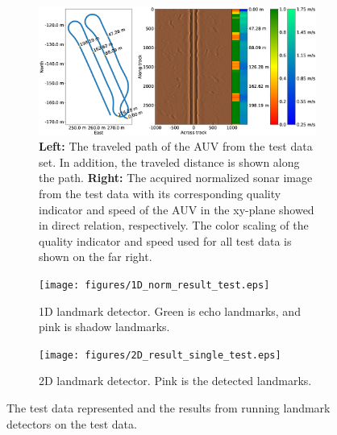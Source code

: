 \begin{figure} [hb] %
     \centering
    \begin{subfigure}[t]{0.87\textwidth}
         \centering
         \includegraphics[trim=0cm 3.4cm 0cm 3.4cm, clip=true, width=\textwidth]{figures/path_sonar_colorbars_test.eps}
         \caption{\textbf{Left:} The traveled path of the AUV from the test data set. In addition, the traveled distance is shown along the path. \textbf{Right:} The acquired normalized sonar image from the test data with its corresponding quality indicator and speed of the AUV in the xy-plane showed in direct relation, respectively. The color scaling of the quality indicator and speed used for all test data is shown on the far right.}
         \label{fig:test_data}
     \end{subfigure}
     \hfill
     \begin{subfigure}[b]{0.44\textwidth}
         \centering
         \texttt{[image: figures/1D\_norm\_result\_test.eps]}
         \caption{1D landmark detector. Green is echo landmarks, and pink is shadow landmarks.}
         \label{fig:1D_norm_result_test}
     \end{subfigure}
     \begin{subfigure}[b]{0.44\textwidth}
         \centering
         \texttt{[image: figures/2D\_result\_single\_test.eps]}
         \caption{2D landmark detector. Pink is the detected landmarks.}
         \label{fig:2D_result_single_test}
     \end{subfigure}
        \caption{The test data represented and the results from running landmark detectors on the test data.}
        \label{fig:landmark_detection_test_data}
\end{figure}
